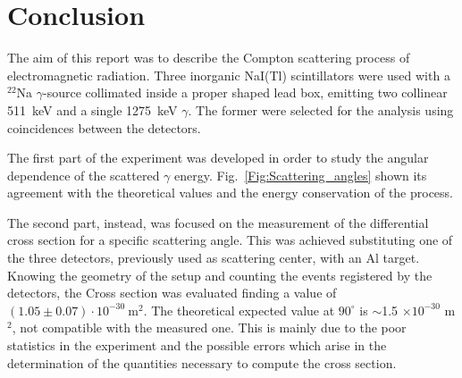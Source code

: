 
\section*{Conclusion}
The aim of this report was to describe the Compton scattering process of electromagnetic radiation. Three inorganic NaI(Tl) scintillators were used with a $^{22}$Na $\gamma$-source collimated inside a proper shaped lead box,  emitting two collinear 511~keV  and a single 1275~keV $\gamma$. The former were selected for the analysis using coincidences between the detectors.

The first part of the experiment  was developed in order to study the angular dependence of the scattered $\gamma$ energy. Fig.~\ref{Fig:Scattering_angles} shown its agreement with the theoretical values and the energy conservation of the process.

The second part, instead, was focused on the measurement of the differential cross section for a specific scattering angle. This was achieved substituting one of the three detectors, previously used as scattering center, with an Al target. Knowing the geometry of the setup and counting the events registered by the detectors, the Cross section was evaluated finding a value of $(1.05\pm0.07)\cdot 10^{-30}\ \text{m}^{2}$.  The theoretical expected value at $90^\circ$ is $\sim$1.5 $\times 10^{-30}$ m$^2$, not compatible with the measured one. This is mainly due to the poor statistics in the experiment and the possible errors which arise in the determination of the quantities necessary to compute the cross section.
